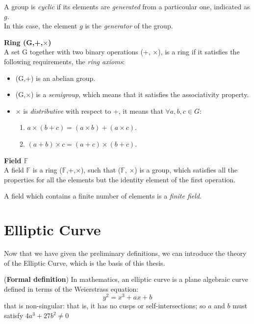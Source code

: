 A group is \textit{cyclic} if its elements are \textit{generated} from a particoular one, indicated as $g$.\\
In this case, the element $g$ is the \textit{generator} of the group.

\begin{teorema}{\textbf{Ring (G,+,$\times$)}}\\
	A set G together with two binary operations (+, $\times$), is a ring if it satisfies the following requirements, the \textit{ring axioms}:
	\begin{itemize}
		\item (G,+) is an abelian group.
		\item (G,$\times$) is a \textit{semigroup}, which means that it satisfies the associativity property.
		\item $\times$ is \textit{distributive} with respect to +, it means that $\forall a,b,c \in G$:
		\begin{enumerate}
			\item $a\times (b+c)=(a\times b)+(a\times c)$.
			\item $(a+b)\times c=(a+c)\times (b+c)$.
		\end{enumerate}
	\end{itemize}
\end{teorema}

\begin{teorema}{\textbf{Field $\mathbb{F}$}}\\
	A field $\mathbb{F}$ is a ring ($\mathbb{F}$,+,$\times$), such that ($\mathbb{F}$, $\times$) is a group, which satisfies all the properties for all the elements but the identity element of the first operation.
\end{teorema}

A field which contains a finite number of elements is a \textit{finite field}.




\section{Elliptic Curve}
Now that we have given the preliminary definitions, we can introduce the theory of the Elliptic Curve, which is the basis of this thesis.
\begin{teorema}{(\textbf{Formal definition})}
	In mathematics, an elliptic curve is a plane algebraic curve defined in terms of the Weierstrass equation:
	\begin{equation}
	\label{eqn:EC}
	 y^{2}=x^{3}+ax+b
	\end{equation}
	that is non-singular: that is, it has no cusps or self-intersections; so $a$ and $b$ must satisfy $4a^{3}+27b^{2}\neq 0$
\end{teorema}

